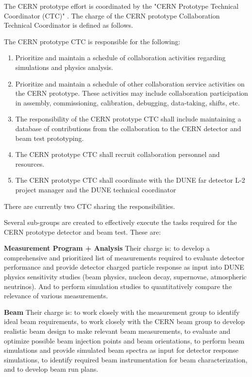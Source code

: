 The CERN prototype effort is coordinated by the "CERN Prototype Technical Coordinator (CTC)" \cite{LBNEorg}.
The charge of the CERN prototype Collaboration Technical Coordinator is defined as follows.

The CERN prototype CTC is responsible for the following:
\begin{enumerate}[i]
	\item Prioritize and maintain a schedule of collaboration activities regarding simulations and physics analysis. 
	\item Prioritize and maintain a schedule of other collaboration service activities on the CERN prototype.  These activities may include collaboration participation in assembly, commissioning, calibration, debugging, data-taking, shifts, etc. 
	\item The responsibility of the CERN prototype CTC shall include maintaining a database of contributions from the collaboration to the CERN detector and beam test prototyping.
	\item The CERN prototype CTC shall recruit collaboration personnel and resources.
	\item The CERN prototype CTC shall coordinate with the DUNE far detector L-2 project manager and the DUNE technical coordinator
\end{enumerate}
There are currently two CTC sharing the responsibilities.

Several sub-groups are created to effectively execute the tasks required for the CERN prototype detector and beam test. These are: 

{\bf Measurement Program + Analysis}   Their charge is: to develop a comprehensive and prioritized list of measurements required to evaluate detector performance and provide detector charged particle response as input into DUNE physics sensitivity studies (beam physics, nucleon decay, supernovae, atmospheric neutrinos).  And to perform simulation studies to quantitatively compare the relevance of various measurements.

{\bf Beam} Their charge is: to work closely with the measurement group to identify ideal beam requirements, to work closely with the CERN beam group to develop realistic beam design to make relevant beam measurements, to evaluate and optimize possible beam injection points and beam orientations, to perform beam simulations and provide simulated beam spectra as input for detector response simulations, to identify required beam instrumentation for beam characterization, and to develop beam run plans.

